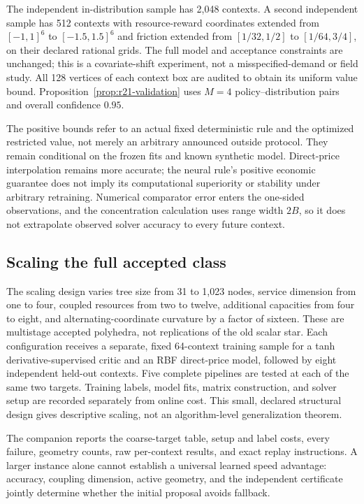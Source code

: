 The independent in-distribution sample has 2,048 contexts. A second independent sample has 512 contexts with resource-reward coordinates extended from $[-1,1]^6$ to $[-1.5,1.5]^6$ and friction extended from $[1/32,1/2]$ to $[1/64,3/4]$, on their declared rational grids. The full model and acceptance constraints are unchanged; this is a covariate-shift experiment, not a misspecified-demand or field study. All 128 vertices of each context box are audited to obtain its uniform value bound. Proposition~\ref{prop:r21-validation} uses $M=4$ policy--distribution pairs and overall confidence $0.95$.



The positive bounds refer to an actual fixed deterministic rule and the optimized restricted value, not merely an arbitrary announced outside protocol. They remain conditional on the frozen fits and known synthetic model. Direct-price interpolation remains more accurate; the neural rule's positive economic guarantee does not imply its computational superiority or stability under arbitrary retraining. Numerical comparator error enters the one-sided observations, and the concentration calculation uses range width $2B$, so it does not extrapolate observed solver accuracy to every future context.

\subsection{Scaling the full accepted class}
The scaling design varies tree size from 31 to 1,023 nodes, service dimension from one to four, coupled resources from two to twelve, additional capacities from four to eight, and alternating-coordinate curvature by a factor of sixteen. These are multistage accepted polyhedra, not replications of the old scalar star. Each configuration receives a separate, fixed 64-context training sample for a tanh derivative-supervised critic and an RBF direct-price model, followed by eight independent held-out contexts. Five complete pipelines are tested at each of the same two targets. Training labels, model fits, matrix construction, and solver setup are recorded separately from online cost. This small, declared structural design gives descriptive scaling, not an algorithm-level generalization theorem.



The companion reports the coarse-target table, setup and label costs, every failure, geometry counts, raw per-context results, and exact replay instructions. A larger instance alone cannot establish a universal learned speed advantage: accuracy, coupling dimension, active geometry, and the independent certificate jointly determine whether the initial proposal avoids fallback.
